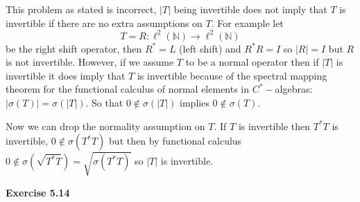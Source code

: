 \documentclass{article}
\begin{document}
This problem as stated is incorrect, $|T|$ being invertible does not imply that $T$ is invertible if there are no extra assumptions on $T$. For example let 
$$ T =R : \ell^2(\mathbb N) \to \ell^2(\mathbb N)$$ 
be the right shift operator, then $R^* = L$ (left shift) and $R^*R = I$ so $|R| = I$ but $R$ is not invertible. However, if we assume $T$ to be a normal operator then if $|T|$ is invertible it does imply that $T$ is invertible because of the spectral mapping theorem for the functional calculus of normal elements in $C^*-$algebras: $|\sigma(T)| = \sigma(|T|)$. So that $0 \not \in \sigma(|T|)$ implies $0 \not \in \sigma(T)$.

\vspace{0.3cm}

Now we can drop the normality assumption on $T$. If $T$ is invertible then $T^*T$ is invertible, $0 \not \in \sigma(T^*T)$ but then by functional calculus $0 \not \in \sigma(\sqrt{T^*T}) = \sqrt{\sigma(T^*T)}$ so $|T|$ is invertible.

\vspace{0.5cm}

\textbf{Exercise 5.14}

\vspace{0.5cm}
\end{document}
